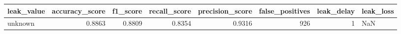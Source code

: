 \begin{tabular}{lrrrrrrl}
\toprule
leak\_value & accuracy\_score & f1\_score & recall\_score & precision\_score & false\_positives & leak\_delay & leak\_loss \\
\midrule
unknown & 0.8863 & 0.8809 & 0.8354 & 0.9316 & 926 & 1 & NaN \\
\bottomrule
\end{tabular}
